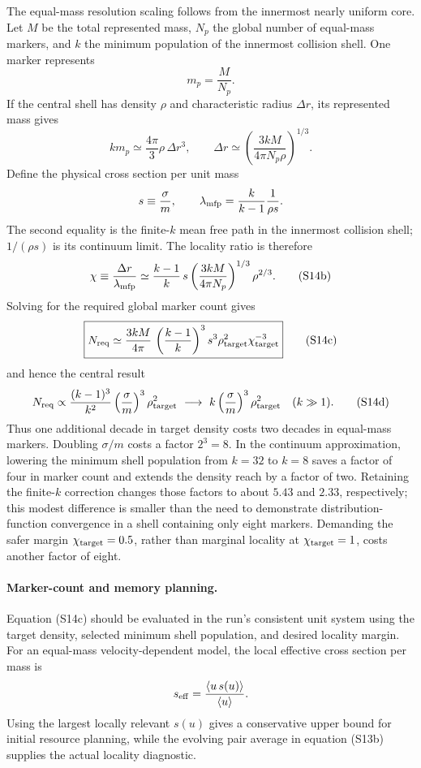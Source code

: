 The equal-mass resolution scaling follows from the innermost nearly uniform
core.  Let \(M\) be the total represented mass, \(N_p\) the global number of
equal-mass markers, and \(k\) the minimum population of the innermost
collision shell.  One marker represents
\[
 m_p=\frac{M}{N_p}.
\]
If the central shell has density \(\rho\) and characteristic radius
\(\Delta r\), its represented mass gives
\[
 k m_p\simeq \frac{4\pi}{3}\rho\,\Delta r^3,
 \qquad
 \Delta r\simeq
 \left(\frac{3kM}{4\pi N_p\rho}\right)^{1/3}.              \tag{S14a}
\]
Define the physical cross section per unit mass
\[
 s\equiv\frac{\sigma}{m},
 \qquad
 \lambda_{\rm mfp}=\frac{k}{k-1}\frac{1}{\rho s}.
\]
The second equality is the finite-\(k\) mean free path in the innermost
collision shell; \(1/(\rho s)\) is its continuum limit.
The locality ratio is therefore
\[
 \chi\equiv\frac{\Delta r}{\lambda_{\rm mfp}}
 \simeq
 \frac{k-1}{k}\,
 s\left(\frac{3kM}{4\pi N_p}\right)^{1/3}\rho^{2/3}.
                                                               \tag{S14b}
\]
Solving for the required global marker count gives
\[
 \boxed{
 N_{\rm req}\simeq
 \frac{3kM}{4\pi}\,
 \left(\frac{k-1}{k}\right)^3
 s^3\rho_{\rm target}^2\chi_{\rm target}^{-3}}
                                                               \tag{S14c}
\]
and hence the central result
\[
 N_{\rm req}\propto
 \frac{(k-1)^3}{k^2}
 \left(\frac{\sigma}{m}\right)^3\rho_{\rm target}^2
 \ \longrightarrow\
 k\left(\frac{\sigma}{m}\right)^3\rho_{\rm target}^2
 \quad(k\gg1).
                                                               \tag{S14d}
\]
Thus one additional decade in target density costs two decades in equal-mass
markers.  Doubling \(\sigma/m\) costs a factor \(2^3=8\).  In the continuum
approximation, lowering the minimum shell population from \(k=32\) to \(k=8\)
saves a factor of four in marker count and extends the density reach by a
factor of two.  Retaining the finite-\(k\) correction changes those factors
to about \(5.43\) and \(2.33\), respectively; this modest difference is
smaller than the need to demonstrate distribution-function convergence in a
shell containing only eight markers.
Demanding the safer margin \(\chi_{\rm target}=0.5\), rather than marginal
locality at \(\chi_{\rm target}=1\), costs another factor of eight.

\paragraph{Marker-count and memory planning.}
Equation (S14c) should be evaluated in the run's consistent unit system using
the target density, selected minimum shell population, and desired locality
margin.  For an equal-mass velocity-dependent model, the local effective
cross section per mass is
\[
 s_{\rm eff}=
 \frac{\langle u\,s(u)\rangle}{\langle u\rangle}.
\]
Using the largest locally relevant \(s(u)\) gives a conservative upper bound
for initial resource planning, while the evolving pair average in equation
(S13b) supplies the actual locality diagnostic.

